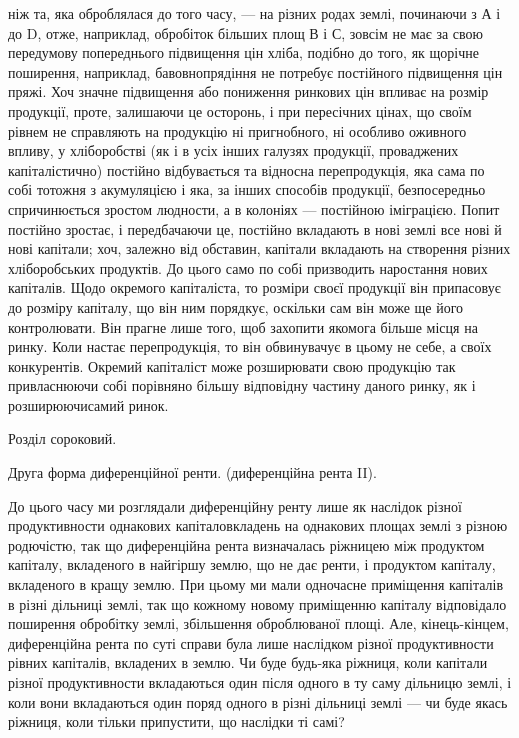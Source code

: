 ніж та, яка оброблялася до того часу, — на різних родах землі, починаючи з А
і до D, отже, наприклад, обробіток більших площ В і С, зовсім не має за свою передумову
попереднього підвищення цін хліба, подібно до того, як щорічне поширення,
наприклад, бавовнопрядіння не потребує постійного підвищення цін пряжі. Хоч
значне підвищення або пониження ринкових цін впливає на розмір продукції,
проте, залишаючи це осторонь, і при пересічних цінах, що своїм рівнем не справляють
на продукцію ні пригнобного, ні особливо оживного впливу, у хліборобстві
(як і в усіх інших галузях продукції, проваджених капіталістично) постійно
відбувається та відносна перепродукція, яка сама по собі тотожня з
акумуляцією і яка, за інших способів продукції, безпосередньо спричинюється
зростом людности, а в колоніях — постійною іміграцією. Попит постійно зростає,
і передбачаючи це, постійно вкладають в нові землі все нові й нові капітали;
хоч, залежно від обставин, капітали вкладають на створення різних хліборобських
продуктів. До цього само по собі призводить наростання нових капіталів.
Щодо окремого капіталіста, то розміри своєї продукції він припасовує до розміру
капіталу, що він ним порядкує, оскільки сам він може ще його контролювати.
Він прагне лише того, щоб захопити якомога більше місця на ринку.
Коли настає перепродукція, то він обвинувачує в цьому не себе, а своїх конкурентів.
Окремий капіталіст може розширювати свою продукцію так привласнюючи
собі порівняно більшу відповідну частину даного ринку, як і розширюючисамий
ринок.

Розділ сороковий.

Друга форма диференційної ренти.
(диференційна рента II).

До цього часу ми розглядали диференційну ренту лише як наслідок різної
продуктивности однакових капіталовкладень на однакових площах землі з різною
родючістю, так що диференційна рента визначалась ріжницею між продуктом
капіталу, вкладеного в найгіршу землю, що не дає ренти, і продуктом капіталу,
вкладеного в кращу землю. При цьому ми мали одночасне приміщення капіталів
в різні дільниці землі, так що кожному новому приміщенню капіталу відповідало
поширення обробітку землі, збільшення оброблюваної площі. Але, кінець-кінцем,
диференційна рента по суті справи була лише наслідком різної
продуктивности рівних капіталів, вкладених в землю. Чи буде будь-яка ріжниця,
коли капітали різної продуктивности вкладаються один після одного в ту
саму дільницю землі, і коли вони вкладаються один поряд одного в різні дільниці
землі — чи буде якась ріжниця, коли тільки припустити, що наслідки ті самі?

